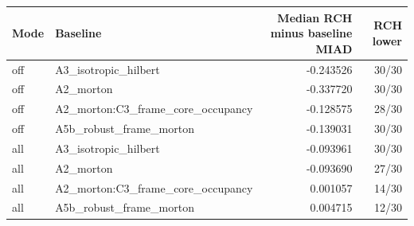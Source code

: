 \begin{tabular}{llrr}
Mode & Baseline & Median RCH minus baseline MIAD & RCH lower \\
\hline
off & A3\_isotropic\_hilbert & -0.243526 & 30/30 \\
off & A2\_morton & -0.337720 & 30/30 \\
off & A2\_morton:C3\_frame\_core\_occupancy & -0.128575 & 28/30 \\
off & A5b\_robust\_frame\_morton & -0.139031 & 30/30 \\
all & A3\_isotropic\_hilbert & -0.093961 & 30/30 \\
all & A2\_morton & -0.093690 & 27/30 \\
all & A2\_morton:C3\_frame\_core\_occupancy & 0.001057 & 14/30 \\
all & A5b\_robust\_frame\_morton & 0.004715 & 12/30 \\
\end{tabular}
